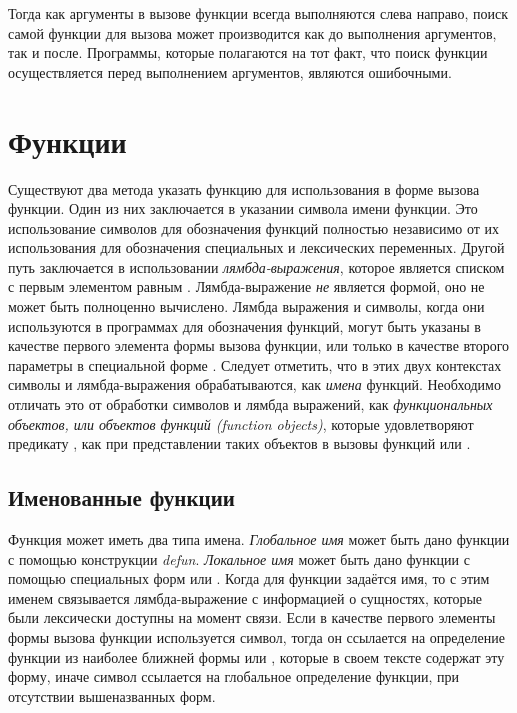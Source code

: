 Тогда как аргументы в вызове функции всегда выполняются слева направо,
поиск самой функции для вызова может производится как до выполнения аргументов,
так и после. Программы, которые полагаются на тот факт, что поиск функции
осуществляется перед выполнением аргументов, являются ошибочными.

\section{Функции}

Существуют два метода указать функцию для использования в форме вызова
функции. Один из них заключается в указании символа имени функции. Это
использование символов для обозначения функций полностью независимо от их
использования для обозначения специальных и лексических переменных. Другой путь
заключается в использовании \emph{лямбда-выражения}, которое является списком
с первым элементом равным . Лямбда-выражение \emph{не} является
формой, оно не может быть полноценно вычислено. Лямбда выражения и символы,
когда они используются в программах для обозначения функций, могут быть
указаны в качестве первого элемента формы вызова функции, или только в качестве
второго параметры в специальной форме . Следует отметить, что
в этих двух контекстах символы и лямбда-выражения обрабатываются, как
\emph{имена} функций. Необходимо отличать это от обработки символов и лямбда
выражений, как \emph{функциональных объектов, или объектов функций (function
  objects)}, которые удовлетворяют предикату , как при
представлении таких объектов в вызовы функций  или . 

\subsection{Именованные функции}

Функция может иметь два типа имена.
\emph{Глобальное имя} может быть дано функции с помощью конструкции
\emph{defun}.
\emph{Локальное имя} может быть дано функции с помощью специальных форм
 или .
Когда для функции задаётся имя, то с этим именем связывается лямбда-выражение с
информацией о сущностях, которые были лексически доступны на момент связи.
Если в качестве первого элементы формы вызова функции используется символ, тогда
он ссылается на определение функции из наиболее ближней формы  или
, которые в своем тексте содержат эту форму, иначе символ ссылается на
глобальное определение функции, при отсутствии вышеназванных форм.

